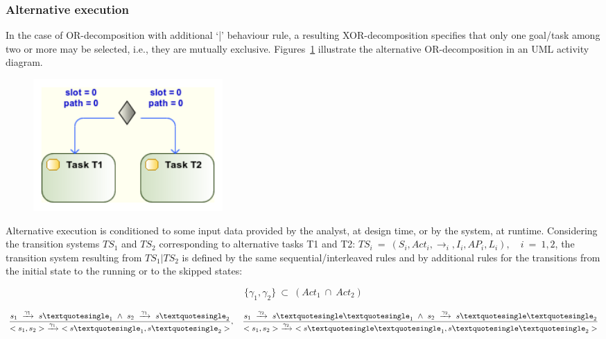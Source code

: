
\subsubsection{Alternative execution}

In the case of OR-decomposition with additional `|' behaviour rule, a resulting XOR-decomposition specifies that only one goal/task among two or more may be selected, i.e., they are mutually exclusive. Figures~\ref{fig:UML_ALT_TSKS} illustrate the alternative OR-decomposition in an UML activity diagram.

\begin{figure}[ht!]
\centering
\includegraphics[width=0.35\textwidth]{imgs/UML_ALT_TSKS.png}
\caption{}
\label{fig:UML_ALT_TSKS}
\end{figure}

Alternative execution is conditioned to some input data provided by the analyst, at design time, or by the system, at runtime. Considering the transition systems $TS_1$ and $TS_2$ corresponding to alternative tasks T1 and T2: $TS_i\ =\ (S_i, Act_i, \rightarrow_i, I_i, AP_i, L_i),\quad i\ =\ 1,2$, the transition system resulting from $TS_1|TS_2$ is defined by the same sequential/interleaved rules and by additional rules for the transitions from the initial state to the running or to the skipped states: 

$$\{\gamma_1, \gamma_2\}\ \subset\ (Act_1\ \cap\ Act_2)$$

$$\frac{s_1\ \xrightarrow{\gamma_1}\ s\textquotesingle_1\ \wedge\ s_2\ \xrightarrow{\gamma_1}\ s\textquotesingle_2}{<s_1,s_2>\ \xrightarrow{\gamma_1}\ <s\textquotesingle_1, s\textquotesingle_2>},\quad \frac{s_1\ \xrightarrow{\gamma_2}\ s\textquotesingle\textquotesingle_1\ \wedge\ s_2\ \xrightarrow{\gamma_2}\ s\textquotesingle\textquotesingle_2}{<s_1,s_2>\ \xrightarrow{\gamma_2}\ <s\textquotesingle\textquotesingle_1, s\textquotesingle\textquotesingle_2>}$$
\medskip

